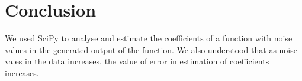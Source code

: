 \documentclass[12pt, a4paper]{report}
\begin{document}
\section*{Conclusion}
We used SciPy to analyse and estimate the coefficients of a function with noise values in the generated output of the function. We also understood that as noise vales in the data increases, the value of error in estimation of coefficients increases.
\end{document}
